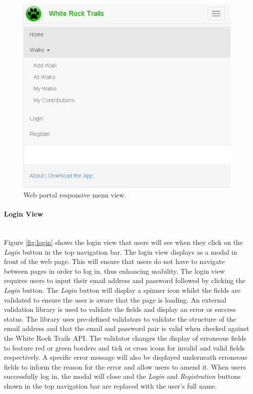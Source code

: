 \documentclass[11pt,a4paper]{report}
\begin{document}
\begin{figure}[H]

\centering

\includegraphics[width=1\linewidth]{./img/webportal/home-responsive}

\caption{Web portal responsive menu view.}

\label{fig:home-responsive}

\end{figure}



\paragraph{Login View}\mbox{}\\
Figure \ref{fig:login} shows the login view that users will see when they click on the \emph{Login} button in the top navigation bar. The login view displays as a modal in front of the web page. This will ensure that users do not have to navigate between pages in order to log in, thus enhancing usability. The login view requires users to input their email address and password followed by clicking the \emph{Login} button. The \emph{Login} button will display a spinner icon whilst the fields are validated to ensure the user is aware that the page is loading. An external validation library is used to validate the fields and display an error or success status. The library uses pre-defined validators to validate the structure of the email address and that the email and password pair is valid when checked against the White Rock Trails API. The validator changes the display of erroneous fields to feature red or green borders and tick or cross icons for invalid and valid fields respectively. A specific error message will also be displayed underneath erroneous fields to inform the reason for the error and allow users to amend it. When users successfully log in, the modal will close and the \emph{Login} and \emph{Registration} buttons shown in the top navigation bar are replaced with the user's full name\cite{milestone2}.
\end{document}
